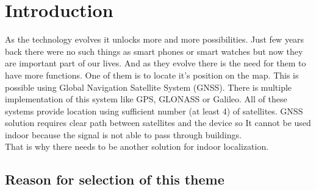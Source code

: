 \chapter{Introduction}\label{sec:Introduction}
\setcounter{page}{1}
As the technology evolves it unlocks more and more possibilities. Just few years back there were no such things as smart phones or smart watches but now they are important part of our lives. And as they evolve there is the need for them to have more functions. One of them is to locate it's position on the map. This is possible using Global Navigation Satellite System (GNSS). There is multiple implementation of this system like GPS, GLONASS or Galileo. All of these systems provide location using sufficient number (at least 4) of satellites. \iffalse[https://books.google.cz/books?id=Np7y43HU_m8C&printsec=frontcover&hl=cs#v=onepage&q&f=false]\fi GNSS  solution requires clear path between satellites and the device so It cannot be used indoor because the signal is not able to pass through buildings.
\\That is why there needs to be another solution for indoor localization. 

\section{Reason for selection of this theme}\label{sec:ReasonForSelectionOfThisTheme}